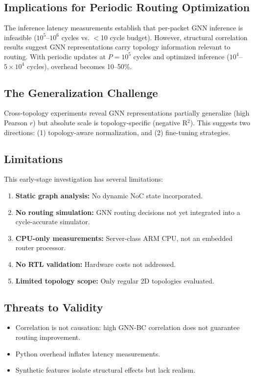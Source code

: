 \documentclass[conference]{IEEEtran}
\begin{document}
\subsection{Implications for Periodic Routing Optimization}

The inference latency measurements establish that per-packet GNN inference is infeasible ($10^5$--$10^6$ cycles vs. $<$10 cycle budget). However, structural correlation results suggest GNN representations carry topology information relevant to routing. With periodic updates at $P=10^5$ cycles and optimized inference ($10^4$--$5\times10^4$ cycles), overhead becomes 10--50\%.

\subsection{The Generalization Challenge}

Cross-topology experiments reveal GNN representations partially generalize (high Pearson $r$) but absolute scale is topology-specific (negative R$^2$). This suggests two directions: (1) topology-aware normalization, and (2) fine-tuning strategies.

\subsection{Limitations}
\label{sec:limitations}

This early-stage investigation has several limitations:
\begin{enumerate}
    \item \textbf{Static graph analysis:} No dynamic NoC state incorporated.
    \item \textbf{No routing simulation:} GNN routing decisions not yet integrated into a cycle-accurate simulator.
    \item \textbf{CPU-only measurements:} Server-class ARM CPU, not an embedded router processor.
    \item \textbf{No RTL validation:} Hardware costs not addressed.
    \item \textbf{Limited topology scope:} Only regular 2D topologies evaluated.
\end{enumerate}

\subsection{Threats to Validity}

\begin{itemize}
    \item Correlation is not causation: high GNN-BC correlation does not guarantee routing improvement.
    \item Python overhead inflates latency measurements.
    \item Synthetic features isolate structural effects but lack realism.
\end{itemize}
\end{document}
